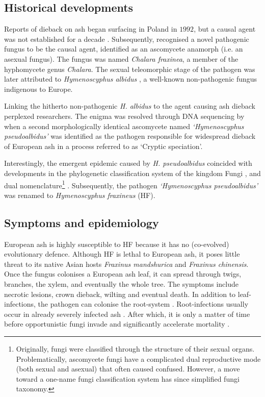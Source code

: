 \subsection{Historical developments}

Reports of dieback on ash began surfacing in Poland in $1992$, but a causal agent was not established
for a decade \cite{kowalski2001zamieraniu, coetsee2000xenochalara}. Subsequently, \cite{kowalski2006chalara} 
recognised a novel pathogenic fungus to be the causal agent, identified as an ascomycete anamorph (i.e. an asexual fungus).
The fungus was named \textit{Chalara fraxinea}, a member of the hyphomycete genus \textit{Chalara}. 
The sexual teleomorphic stage of the pathogen was later attributed to \textit{Hymenoscyphus albidus} 
\cite{kowalski2009teleomorph}, a well-known non-pathogenic fungus indigenous to Europe.

Linking the hitherto non-pathogenic \textit{H. albidus} to the agent causing ash dieback perplexed researchers. 
The enigma was resolved through DNA sequencing by \cite{queloz2011cryptic} when a second morphologically identical
ascomycete named \textit{`Hymenoscyphus pseudoalbidus'} was identified as the pathogen responsible for widespread dieback
of European ash in a process referred to as `Cryptic speciation'.

Interestingly, the emergent epidemic caused by \textit{H. pseudoalbidus} coincided with developments 
in the phylogenetic classification system of the kingdom Fungi \cite{hibbett2007higher}, 
and dual nomenclature\footnote{Originally, fungi were classified through the structure of their sexual organs.
Problematically, ascomycete fungi have a complicated dual reproductive mode (both sexual and asexual) that often caused confused. 
However, a move toward a one-name fungi classification system has since simplified fungi taxonomy.} 
\cite{wingfield2012one}. Subsequently, the pathogen \textit{`Hymenoscyphus pseudoalbidus'} was renamed to
\textit{Hymenoscyphus fraxineus} (HF).

\subsection{Symptoms and epidemiology}

European ash is highly susceptible to HF because it has no (co-evolved) evolutionary defence.
Although HF is lethal to European ash, it poses little threat to its native Asian hosts 
\textit{Fraxinus mandshurica} and \textit{Fraxinus chinensis}. Once the fungus colonises a European ash leaf,
it can spread through twigs, branches, the xylem, and eventually the whole tree.
The symptoms include necrotic lesions, crown dieback, wilting and eventual death.
In addition to leaf-infections, the pathogen can colonise the root-system \cite{schumacher2011general}.
Root-infections usually occur in already severely infected ash \cite{https://doi.org/10.1111/mpp.12073}. 
After which, it is only a matter of time before opportunistic fungi invade and significantly accelerate mortality
\cite{enderle2013temporal}.

